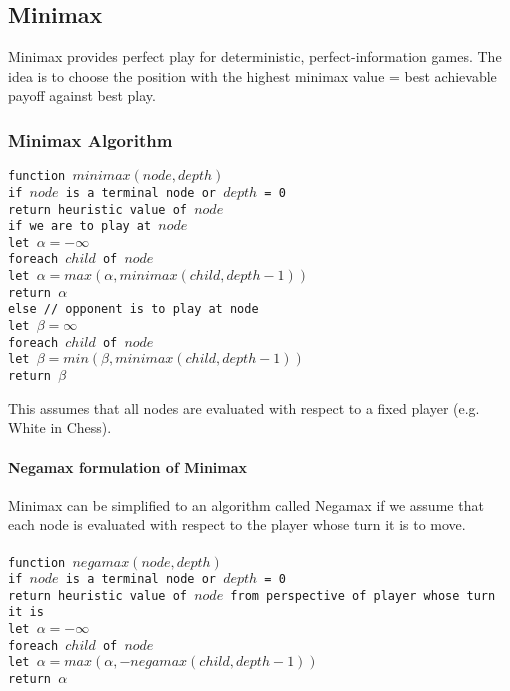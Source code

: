 \subsection{Minimax}
Minimax provides perfect play for deterministic, perfect-information games. The
idea is to choose the position with the highest minimax value = best achievable
payoff against best play.

\subsubsection{Minimax Algorithm}
\texttt{function $minimax(node, depth)$\\
\indent if $node$ is a terminal node or $depth$ = 0\\
\indent\indent return heuristic value of $node$\\
\indent if we are to play at $node$\\
\indent\indent let $\alpha = -\infty$\\
\indent\indent foreach $child$ of $node$\\
\indent\indent\indent let $\alpha = max(\alpha, minimax(child, depth-1))$\\
\indent\indent return $\alpha$\\
\indent else // opponent is to play at node\\
\indent\indent let $\beta = \infty$\\
\indent\indent foreach $child$ of $node$\\
\indent\indent\indent let $\beta = min(\beta, minimax(child, depth-1))$\\
\indent\indent return $\beta$
}

This assumes that all nodes are evaluated with respect to a fixed player (e.g.
White in Chess).

\paragraph{Negamax formulation of Minimax}
Minimax can be simplified to an algorithm called Negamax if we assume that each
node is evaluated with respect to the player whose turn it is to move.\\\\
\texttt{function $negamax(node, depth)$\\
\indent if $node$ is a terminal node or $depth$ = 0\\
\indent\indent return heuristic value of $node$ from perspective of player
whose turn it is\\
\indent let $\alpha = -\infty$\\
\indent foreach $child$ of $node$\\
\indent\indent let $\alpha = max(\alpha, -negamax(child, depth-1))$\\
\indent return $\alpha$\\
}

